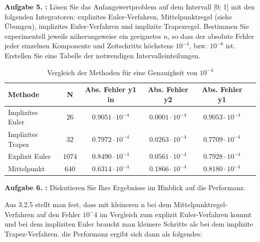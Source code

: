 \begin{mybox}
	\textbf{Aufgabe 5. :}	Lösen Sie das Anfangswertproblem auf dem Intervall [0; 1] mit den folgenden Integratoren: explizites
	Euler-Verfahren, Mittelpunktregel (siehe Übungen), implizites Euler-Verfahren und implizite
	Trapezregel. Bestimmen Sie experimentell jeweils näherungsweise ein geeignetes $n$, so dass der absolute Fehler jeder einzelnen Komponente und Zeitschritts höchstens $10^{-4}$, bzw. $10^{-6}$ ist.
	Erstellen Sie eine Tabelle der notwendigen Intervalleinteilungen.
\end{mybox}
\begin{table}
	\centering
	\caption{Vergleich der Methoden für eine Genauigkeit von $10^{-4}$}
	\label{t:const}
	\begin{tabular}{lccccc}
		\toprule
		
		Methode      & N  & Abs. Fehler y1 in  &     Abs. Fehler y2 & Abs. Fehler y1                   \\
		\midrule
		Implizites Euler  & $26$ & $0.9051\cdot10^{-4}$  & $0.0001\cdot10^{-4} $ &      $0.9053\cdot10^{-4}$        \\
		Implizites Trapez  & $32$ & $0.7972 \cdot10^{-4} $  & $0.0263\cdot10^{-4} $ &      $0.7709\cdot10^{-4}$        \\
		Explizit Euler  & $1074$ & $	0.8490\cdot10^{-4}  $  & $0.0561 \cdot10^{-4} $ &      $0.7928\cdot10^{-4}$        \\
      	Mittelpunkt  & $ 640 $ & $	0.6314\cdot10^{-4}  $  & $0.1866  \cdot10^{-4} $ &      $0.8180\cdot10^{-4}$        \\
	              
		\bottomrule
		
	\end{tabular}
\end{table}





\begin{mybox}
	\textbf{Aufgabe 6. :} Diskutieren Sie Ihre Ergebnisse im Hinblick auf die Performanz.
\end{mybox}


Aus 3.2.5 stellt man fest, dass mit kleineren n bei dem Mittelpunktregel-Verfahren auf den Fehler $ 10^-4 $ im Vergleich zum explizit Euler-Verfahren kommt und bei dem impliziten Euler braucht man kleinere Schritte als bei dem implizite Trapez-Verfahren. die Performanz ergibt sich dann als folgendes:


